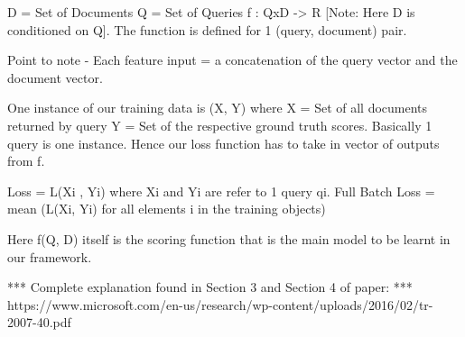 \documentclass[11pt]{report}
\begin{document}
    D = {Set of Documents}
    Q = {Set of Queries}
    f : QxD -> R [Note: Here D is conditioned on Q]. The function is defined for 1 (query, document) pair.

    Point to note - Each feature input = a concatenation of the query vector and the document vector.

    One instance of our training data is (X, Y) where X = {Set of all documents returned by query} Y = {Set of the respective ground
    truth scores}. Basically 1 query is one instance. Hence our loss function has to take in vector of outputs from f.

    Loss = L(Xi , Yi) where Xi and Yi are refer to 1 query qi.
    Full Batch Loss = mean (L(Xi, Yi) for all elements i in the training objects)

    Here f(Q, D) itself is the scoring function that is the main model to be learnt in our framework.

    *** Complete explanation found in Section 3 and Section 4 of paper:
        *** https://www.microsoft.com/en-us/research/wp-content/uploads/2016/02/tr-2007-40.pdf
\end{document}
